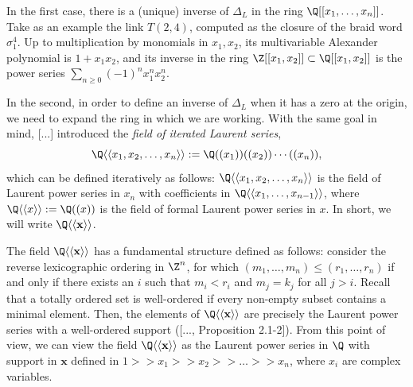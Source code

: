 \documentclass[11pt,e-only]{amsart}
\begin{document}
In the first case, there is a (unique) inverse of $\Delta_L$ in the ring $\Q[[x_1,\dots,x_n]]$. Take as an example the link $T(2,4)$, computed as the closure of the braid word $\sigma_1^4$. Up to multiplication by monomials in $x_1,x_2$, its multivariable Alexander polynomial is $1+x_1x_2$, and its inverse in the ring $\Z[[x_1,x_2]]\subset \Q[[x_1,x_2]]$ is the power series $\sum_{n\geq 0}(-1)^n x_1^n x_2^n$.

In the second, in order to define an inverse of $\Delta_L$ when it has a zero at the origin, we need to expand the ring in which we are working. With the same goal in mind, [...] introduced the \textit{field of iterated Laurent series}, \[\Q\langle\langle x_1,x_2,\dots,x_n\rangle\rangle:=\Q((x_1))((x_2))\cdots((x_n)),\] which can be defined iteratively as follows: $\Q\langle\langle x_1,x_2,\dots,x_n\rangle\rangle$ is the field of Laurent power series in $x_n$ with coefficients in $\Q\langle\langle x_1,\dots,x_{n-1}\rangle\rangle$, where $\Q\langle\langle x\rangle\rangle:=\Q((x))$ is the field of formal Laurent power series in $x$. In short, we will write $\Q\langle\langle \textbf{x}\rangle\rangle$.


The field $\Q\langle\langle \textbf{x}\rangle\rangle$ has a fundamental structure defined as follows: consider the reverse lexicographic ordering in $\Z^n$, for which $(m_1,\dots,m_n)\leq (r_1,\dots,r_n)$ if and only if there exists an $i$ such that $m_i<r_i$ and $m_j=k_j$ for all $j> i$. Recall that a totally ordered set is well-ordered if every non-empty subset contains a minimal element.  %
Then, the elements of $\Q\langle\langle \textbf{x}\rangle\rangle$ are precisely the Laurent power series with a well-ordered support ([..., Proposition 2.1-2]). From this point of view, we can view the field $\Q\langle\langle \textbf{x}\rangle\rangle$ as the Laurent power series in $\Q$ with support in $\mathbf{x}$ defined in $1>>x_1>>x_2>>\dots>>x_n$, where $x_i$ are complex variables. %
\end{document}

